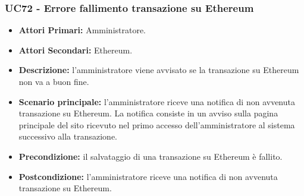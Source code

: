 \subsubsection{ UC72 - Errore fallimento transazione su Ethereum }
\begin{itemize}
	\item\textbf{Attori Primari:} Amministratore.
	\item\textbf{Attori Secondari:} Ethereum.
	\item\textbf{Descrizione:} l'amministratore viene avvisato se la transazione su Ethereum non va a buon fine.
	\item\textbf{Scenario principale:} l'amministratore riceve una notifica di non avvenuta transazione su Ethereum. La notifica consiste in un avviso sulla pagina principale del sito ricevuto nel primo accesso dell'amministratore al sistema successivo alla transazione.
	\item\textbf{Precondizione:} il salvataggio di una transazione su Ethereum è fallito.
	\item\textbf{Postcondizione:} l'amministratore riceve una notifica di non avvenuta transazione su Ethereum.
\end{itemize}